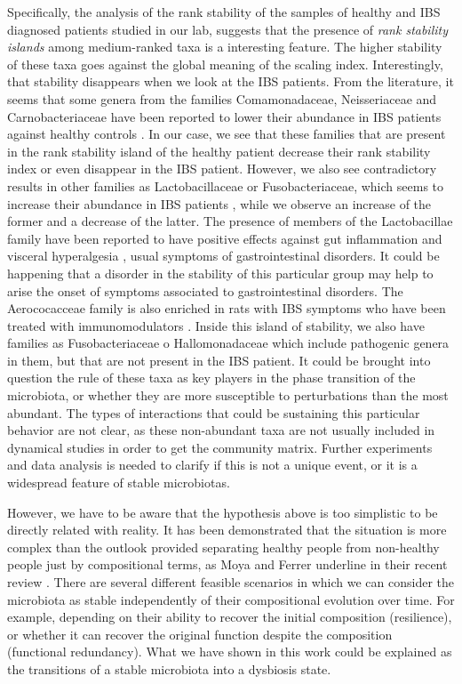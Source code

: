 Specifically, the analysis of the rank stability of the samples of healthy and IBS diagnosed patients studied in our lab\cite{IBS}, suggests that the presence of \emph{rank stability islands} among medium-ranked taxa is a interesting feature. The higher stability of these taxa goes against the global meaning of the scaling index. Interestingly, that stability disappears when we look at the IBS patients. From the literature, it seems that some genera from the families Comamonadaceae, Neisseriaceae and Carnobacteriaceae have been reported to lower their abundance in IBS patients against healthy controls \cite{sislands1}. In our case, we see that these families that are present in the rank stability island of the healthy patient decrease their rank stability index or even disappear in the IBS patient. However, we also see contradictory results in other families as Lactobacillaceae or Fusobacteriaceae, which seems to increase their abundance in IBS patients \cite{sislands2}, while we observe an increase of the former and a decrease of the latter. The presence of members of the Lactobacillae family have been reported to have positive effects against gut inflammation and visceral hyperalgesia \cite{sislands3}, usual symptoms of gastrointestinal disorders. It could be happening that a disorder in the stability of this particular group may help to arise the onset of symptoms associated to gastrointestinal disorders. The Aerococacceae family is also enriched in rats with IBS symptoms who have been treated with immunomodulators \cite{sislands4}. Inside this island of stability, we also have families as Fusobacteriaceae o Hallomonadaceae which include pathogenic genera in them, but that are not present in the IBS patient. It could be brought into question the rule of these taxa as key players in the phase transition of the microbiota, or whether they are more susceptible to perturbations than the most abundant. The types of interactions that could be sustaining this particular behavior are not clear, as these non-abundant taxa are not usually included in dynamical studies in order to get the community matrix. Further experiments and data analysis is needed to clarify if this is not a unique event, or it is a widespread feature of stable microbiotas. 

However, we have to be aware that the hypothesis above is too simplistic to be directly related with reality. It has been demonstrated that the situation is more complex than the outlook provided separating healthy people from non-healthy people just by compositional terms, as Moya and Ferrer underline in their recent review \cite{Moya_trends}. There are several different feasible scenarios in which we can consider the microbiota as stable independently of their compositional evolution over time. For example, depending on their ability to recover the initial composition (resilience), or whether it can recover the original function despite the composition (functional redundancy). What we have shown in this work could be explained as the transitions of a stable microbiota into a dysbiosis state.  

